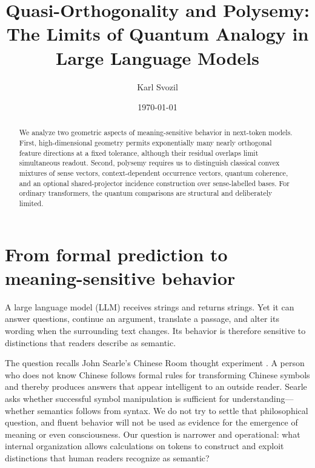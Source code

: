\documentclass[
  aps,
  reprint,
  superscriptaddress,
  floatfix,
  nofootinbib,
  longbibliography
]{revtex4-2}
\begin{document}
\title{Quasi-Orthogonality and Polysemy:\texorpdfstring{\\}{ }
The Limits of Quantum Analogy in Large Language Models}

\author{Karl Svozil}

\date{\today}

\begin{abstract}
We analyze two geometric aspects of meaning-sensitive behavior in next-token
models.  First, high-dimensional geometry permits exponentially many nearly
orthogonal feature directions at a fixed tolerance, although their residual
overlaps limit simultaneous readout.  Second, polysemy requires us to
distinguish classical convex mixtures of sense vectors, context-dependent
occurrence vectors, quantum coherence, and an optional shared-projector
incidence construction over sense-labelled bases.  For ordinary transformers,
the quantum comparisons are structural and deliberately limited.
\end{abstract}

\maketitle

\section{From formal prediction to meaning-sensitive behavior}
\label{sec:puzzle}

A large language model (LLM) receives strings and returns strings.  Yet it can
answer questions, continue an argument, translate a passage, and alter its
wording when the surrounding text changes.  Its behavior is therefore
sensitive to distinctions that readers describe as semantic.

The question recalls John Searle's Chinese Room thought experiment
\cite{searl-80a}.  A person who does not know Chinese follows formal rules for
transforming Chinese symbols and thereby produces answers that appear
intelligent to an outside reader.  Searle asks whether successful symbol
manipulation is sufficient for understanding---whether semantics follows from
syntax.  We do not try to settle that philosophical question, and fluent
behavior will not be used as evidence for the emergence of meaning or even
consciousness.  Our question is narrower and operational: what internal
organization allows calculations on tokens to construct and exploit distinctions that
human readers recognize as semantic?
\end{document}
